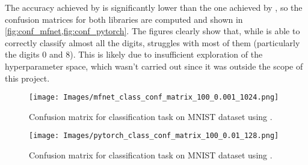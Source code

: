 The accuracy achieved by \pytorch is significantly lower than the one achieved by \mfnet, so the confusion matrices for both libraries are computed and shown in \cref{fig:conf_mfnet,fig:conf_pytorch}. The figures clearly show that, while \mfnet is able to correctly classify almost all the digits, \pytorch struggles with most of them (particularly the digits 0 and 8). This is likely due to insufficient exploration of the hyperparameter space, which wasn't carried out since it was outside the scope of this project.

\begin{figure}[ht]
    \centering
    \texttt{[image: Images/mfnet\_class\_conf\_matrix\_100\_0.001\_1024.png]}
    \caption{Confusion matrix for classification task on MNIST dataset using \mfnet.}
    \label{fig:conf_mfnet}
\end{figure}

\begin{figure}[ht]
    \centering
    \texttt{[image: Images/pytorch\_class\_conf\_matrix\_100\_0.01\_128.png]}
    \caption{Confusion matrix for classification task on MNIST dataset using \pytorch.}
    \label{fig:conf_pytorch}
\end{figure}
